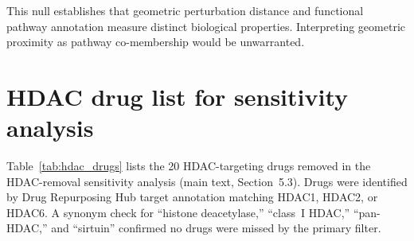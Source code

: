 \documentclass[11pt]{article}
\begin{document}
This null establishes that geometric perturbation distance and functional
pathway annotation measure distinct biological properties.  Interpreting
geometric proximity as pathway co-membership would be unwarranted.

\section{HDAC drug list for sensitivity analysis}
\label{sec:hdac_list}

Table~\ref{tab:hdac_drugs} lists the 20 HDAC-targeting drugs removed in
the HDAC-removal sensitivity analysis (main text, Section~5.3).  Drugs
were identified by Drug Repurposing Hub target annotation matching
HDAC1, HDAC2, or HDAC6.  A synonym check for ``histone deacetylase,''
``class~I HDAC,'' ``pan-HDAC,'' and ``sirtuin'' confirmed no drugs were
missed by the primary filter.
\end{document}
